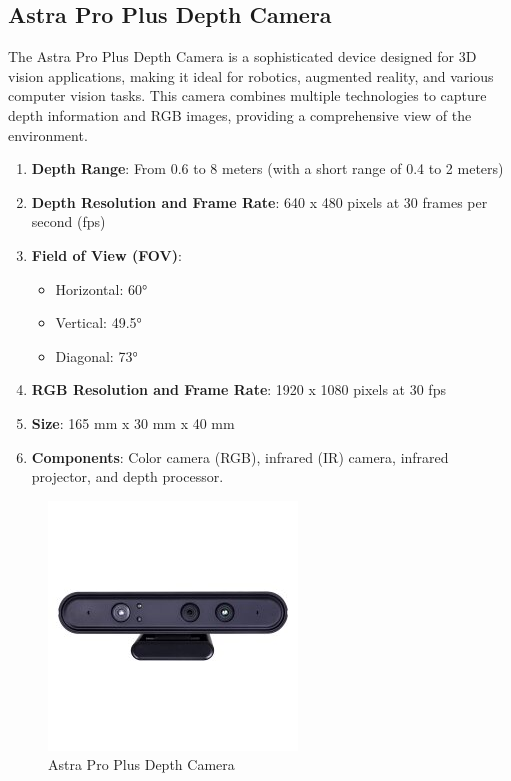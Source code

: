 \subsection{\fontsize{14}{16} Astra Pro Plus Depth Camera}
{
	\fontsize{12}{14}
	The Astra Pro Plus Depth Camera is a sophisticated device designed for 3D vision applications, making it ideal for robotics, augmented reality, and various computer vision tasks. This camera combines multiple technologies to capture depth information and RGB images, providing a comprehensive view of the environment.
	\begin{enumerate}
		\item \textbf{Depth Range}: From 0.6 to 8 meters (with a short range of 0.4 to 2 meters)
		
		\item \textbf{Depth Resolution and Frame Rate}: 640 x 480 pixels at 30 frames per second (fps)
		
		\item \textbf{Field of View (FOV)}:
		\begin{itemize}
			\item Horizontal: 60°
			\item Vertical: 49.5°
			\item Diagonal: 73°
		\end{itemize}
		
		\item \textbf{RGB Resolution and Frame Rate}: 1920 x 1080 pixels at 30 fps
		
		\item \textbf{Size}: 165 mm x 30 mm x 40 mm
		
		\item \textbf{Components}: Color camera (RGB), infrared (IR) camera, infrared projector, and depth processor.

	\end{enumerate}
	
	\begin{figure}[H]
		\centering
		\includegraphics[scale=0.84]{images/Content/astra_pro_plus}
		\caption{Astra Pro Plus Depth Camera} 
		\label{fig:depthcamera}
	\end{figure}
}

